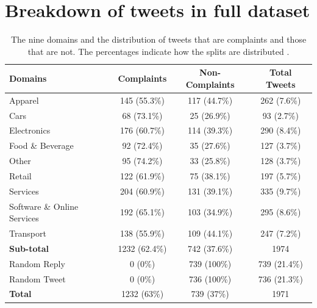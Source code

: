 \section{Breakdown of tweets in full dataset}
\begin{table}[ht]
    \captionsetup{font=small}
    \centering
    \begin{tabularx}{\textwidth}{|X|c|c|c|}
        \hline
        \rowcolor[gray]{0.7}
        \textbf{Domains}            & \textbf{Complaints}   & \textbf{Non-Complaints} & \textbf{Total Tweets} \\
        \hline
        Apparel                     & 145 \small{(55.3\%)}  & 117 \small{(44.7\%)}    & 262 \small{(7.6\%)}   \\
        \hline
        Cars                        & 68 \small{(73.1\%)}   & 25 \small{(26.9\%)}     & 93 \small{(2.7\%)}    \\
        \hline
        Electronics                 & 176 \small{(60.7\%)}  & 114 \small{(39.3\%)}    & 290 \small{(8.4\%)}   \\
        \hline
        Food \& Beverage            & 92 \small{(72.4\%)}   & 35 \small{(27.6\%)}     & 127 \small{(3.7\%)}   \\
        \hline
        Other                       & 95 \small{(74.2\%)}   & 33 \small{(25.8\%)}     & 128 \small{(3.7\%)}   \\
        \hline
        Retail                      & 122 \small{(61.9\%)}  & 75 \small{(38.1\%)}     & 197 \small{(5.7\%)}   \\
        \hline
        Services                    & 204 \small{(60.9\%)}  & 131 \small{(39.1\%)}    & 335 \small{(9.7\%)}   \\
        \hline
        Software \& Online Services & 192 \small{(65.1\%)}  & 103 \small{(34.9\%)}    & 295 \small{(8.6\%)}   \\
        \hline
        Transport                   & 138 \small{(55.9\%)}  & 109 \small{(44.1\%)}    & 247 \small{(7.2\%)}   \\
        \hline
        \rowcolor[gray]{0.9}
        \textbf{Sub-total}          & 1232 \small{(62.4\%)} & 742 \small{(37.6\%)}    & 1974                  \\
        \hline
        \hline
        Random Reply                & 0 \small{(0\%)}       & 739 \small{(100\%)}     & 739 \small{(21.4\%)}  \\
        \hline
        Random Tweet                & 0 \small{(0\%)}       & 736 \small{(100\%)}     & 736 \small{(21.3\%)}  \\
        \hline
        \hline
        \textbf{Total}              & 1232 \small{(63\%)}   & 739 \small{(37\%)}      & 1971                  \\
        \hline
    \end{tabularx}
    \caption{The nine domains and the distribution of tweets that are complaints and those that are not. The percentages indicate how the splits are distributed \cite{preotiuc-pietro_automatically_2019}.}
    \label{tab: fulldataset_breakdown}
\end{table}


